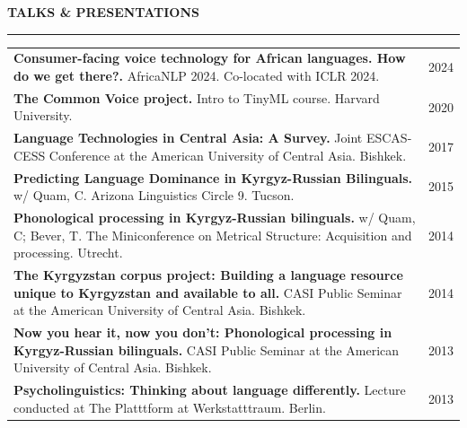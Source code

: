\documentclass{cv} %
\begin{document}

\vspace{0.5cm}

\begin{minipage}{\textwidth}

\sectionskip
\MakeUppercase{\textbf{Talks \& Presentations}}
  \sectionlineskip
  \hrule
\vspace{.5cm}

\renewcommand{\arraystretch}{1.5} %

\begin{tabular}{@{}p{}p{}@{}}

  {\bf Consumer-facing voice technology for African languages. How do we get there?.} {AfricaNLP 2024. Co-located with ICLR 2024.}
  &
  \hfill {2024}
  \\    
  {\bf The Common Voice project.} {Intro to TinyML course. Harvard University.}
  &
  \hfill {2020}
  \\  
  {\bf Language Technologies in Central Asia: A Survey.} {Joint ESCAS-CESS Conference at the American University of Central Asia. Bishkek.}
  &
  \hfill {2017}
  \\
  {\bf Predicting Language Dominance in Kyrgyz-Russian Bilinguals.} {w/ Quam, C.} {Arizona Linguistics Circle 9. Tucson.}
  &
  \hfill {2015}
  \\
  {\bf Phonological processing in Kyrgyz-Russian bilinguals.} {w/ Quam, C; Bever, T.} {The Miniconference on Metrical Structure: Acquisition and processing. Utrecht.}
  &
  \hfill {2014}
  \\
  {\bf The Kyrgyzstan corpus project: Building a language resource unique to Kyrgyzstan and available to all.} {CASI Public Seminar at the American University of Central Asia. Bishkek.}
  &
  \hfill {2014}
  \\
  {\bf Now you hear it, now you don’t: Phonological processing in Kyrgyz-Russian bilinguals.} {CASI Public Seminar at the American University of Central Asia. Bishkek.}
  &
  \hfill {2013}
  \\
  {\bf Psycholinguistics: Thinking about language differently.} {Lecture conducted at The Platttform at Werkstatttraum. Berlin.}
  &
  \hfill {2013}
  \\
\end{tabular}

\end{minipage}
\end{document}
